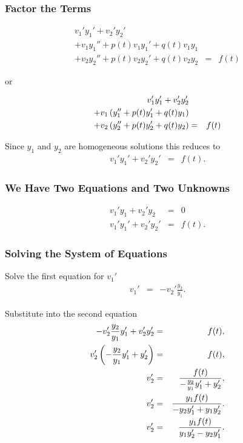 \begin{frame}
  \frametitle{Factor the Terms}

  \begin{eqnarray*}
    v_1' y_1' + v_2' y_2'  & & \\
    + v_1 y_1'' + p(t) v_1 y_1' + q(t) v_1 y_1 & & \\
    + v_2 y_2'' + p(t) v_2 y_2' + q(t) v_2 y_2 & = & f(t)
  \end{eqnarray*}

  or 

  \begin{eqnarray*}
    v_1' y_1' + v_2' y_2'  & & \\
    + v_1 \left( y_1'' + p(t) y_1' + q(t) y_1 \right) & & \\
    + v_2 \left( y_2'' + p(t) y_2' + q(t) y_2 \right) & = & f(t)
  \end{eqnarray*}

  Since $y_1$ and $y_2$ are homogeneous solutions this reduces to 
  \begin{eqnarray}
    \label{eqn:secondConstraint}
    v_1' y_1' + v_2' y_2'  & = & f(t).
  \end{eqnarray}


\end{frame}


\begin{frame}
  \frametitle{We Have Two Equations and Two Unknowns}

  \begin{eqnarray*}
    v_1' y_1 + v_2' y_2 & = & 0 \\
    v_1' y_1' + v_2' y_2'  & = & f(t).
  \end{eqnarray*}


\end{frame}


\begin{frame}
  \frametitle{Solving the System of Equations}

  Solve the first equation for $v_1'$
  \begin{eqnarray*}
    v_1' & = & -v_2' \frac{y_2}{y_1}.
  \end{eqnarray*}

  Substitute into the second equation
  \begin{eqnarray*}
    -v_2' \frac{y_2}{y_1} y_1' + v_2' y_2'  & = & f(t), \\
    v_2' \left( -\frac{y_2}{y_1} y_1' + y_2' \right)  & = & f(t), \\
    v_2' & = & \frac{f(t)}{-\frac{y_2}{y_1} y_1' + y_2'}, \\
    v_2' & = & \frac{y_1 f(t)}{-y_2 y_1' + y_1 y_2'}. \\
    v_2' & = & \frac{y_1 f(t)}{y_1 y_2'-y_2 y_1'}. \\
  \end{eqnarray*}

\end{frame}


